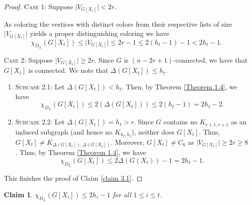 \documentclass[12pt,reqno,a4paper]{amsart}
\theoremstyle{definition}
\newtheorem{claim}[defn]{Claim}
\begin{document}
\begin{proof}

\noindent \textsc{Case 1:}  Suppose $\vert V_{G[X_{t}]}\vert< 2r$.

As coloring the vertices with distinct colors from their respective lists of size $\vert V_{G[X_{t}]}\vert$ yields a proper distinguishing coloring we have
\[\chi_{D_{L}}(G[X_{t}])\leq \vert V_{G[X_{t}]}\vert \leq 2r-1\leq 2(h_{t}-1)-1< 2h_{t}-1.\] 

\noindent \textsc{Case 2:} Suppose $\vert V_{G[X_{t}]}\vert\geq 2r$. Since $G$ is $(n-2r+1)$-connected, we have that $G[X_{t}]$ is connected.
We note that $\Delta(G[X_{t}])\leq h_{t}$.

\vspace{2mm}
\begin{enumerate}
    \item[] \textsc{Subcase 2.1:} Let $\Delta(G[X_{t}])< h_{t}$.
Then, by Theorem \ref{Theorem 1.4}, we have
\[\chi_{D_{L}}(G[X_{t}])\leq 2(\Delta (G[X_{t}]))\leq 2(h_{t}-1)=2h_{t}-2.\]
    \item[] \textsc{Subcase 2.2:}
    Let $\Delta(G[X_{t}])= h_{t}>r$.
Since $G$ contains no $K_{r+1,r+1}$ as an induced subgraph (and hence no $K_{h_{t}, h_{t}}$), neither does $G[X_{t}]$. 
Thus, $G[X_{t}]\neq K_{\Delta(G[X_{t}]), \Delta(G[X_{t}])}$. 
Moreover, $G[X_{t}]\neq C_{6}$ as $\vert V_{G[X_{t}]}\vert\geq 2r\geq 8$.
Thus, by Theorem \ref{Theorem 1.4}, we have
\[\chi_{D_{L}}(G[X_{t}])\leq 2\Delta(G(X_{t}))-1=2h_{t}-1.\]
\end{enumerate} 
This finishes the proof of Claim \ref{claim 3.1}.
\end{proof}

\begin{claim}\label{claim 3.2}
{\em $\chi_{D_{L}}(G[X_{i}])\leq 2h_{i}-1$ for all $1\leq i\leq t$.}
\end{claim}
\end{document}
